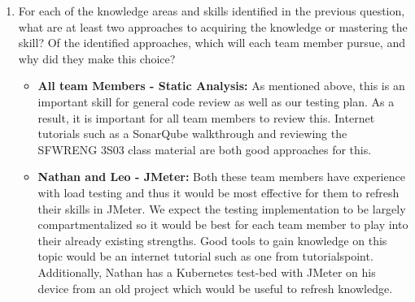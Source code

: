 \documentclass[12pt, titlepage]{article}
\begin{document}
\begin{enumerate}
\begin{itemize}
    \item \textbf{JMeter or other Load Testing Tools: }We will need to test the performance of our web application to identify how it performs under increased loads. JMeter allows us to create HTTP requests and measure how the system responds. This will be especially useful in testing the system response under increased user load or a request with a large data result.

    \item \textbf{Selenium or other test automation approaches: }Selenium is a good example of an
automated web application testing tool. This is a tool that we expect to use, given
that we will be creating a web application for the front-end of our system. The use of Selenium or a similar tool allows us to create repeatable and autonomous web application inputs that can be used to effectively test our front-end interface.

    \item \textbf{PyTest or other unit testing approaches: }Although not yet composed, the VnV plan
will eventually contain an extensive set of unit tests which need to be implemented
in our system. Reviewing or learning about a relevant unit test implementation approach
will be crucial in effectively implementing robust unit tests in our project.

  
  \end{itemize}





  \item For each of the knowledge areas and skills identified in the previous
  question, what are at least two approaches to acquiring the knowledge or
  mastering the skill?  Of the identified approaches, which will each team
  member pursue, and why did they make this choice?

  \begin{itemize}

    \item \textbf{All team Members - Static Analysis: }As mentioned above, this is an important skill for general code review as well as our testing plan. As a result, it is important for all team members to review this. Internet tutorials such as a SonarQube walkthrough and reviewing the SFWRENG 3S03 class material are both good approaches for this.

    \item \textbf{Nathan and Leo - JMeter: }Both these team members have experience with load testing and thus it would be most effective for them to refresh their skills in JMeter. We expect the testing implementation to be largely compartmentalized so it would be best for each team member to play into their already existing strengths. Good tools to gain knowledge on this topic would be an internet tutorial such as one from tutorialspoint. Additionally, Nathan has a Kubernetes test-bed with JMeter on his device from an old project which would be useful to refresh knowledge.


\end{itemize}
\end{enumerate}
\end{document}
